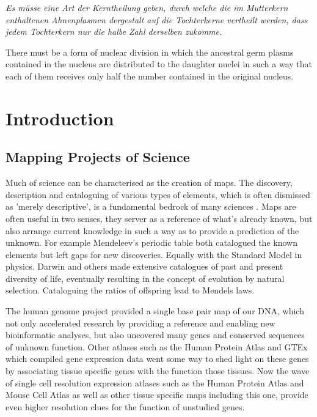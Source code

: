 \begin{savequote}[8cm]
\textit{Es müsse eine Art der Kerntheilung geben, durch welche die im Mutterkern enthaltenen Ahnenplasmen dergestalt auf die Tochterkerne vertheilt werden, dass jedem Tochterkern nur die halbe Zahl derselben zukomme.}

There must be a form of nuclear division in which the ancestral germ plasms contained in the nucleus are distributed to the daughter nuclei in such a way that each of them receives only half the number contained in the original nucleus.
\end{savequote}

\chapter{\label{ch:1-intro}Introduction} 

\minitoc


\section{Mapping Projects of Science}

Much of science can be characterised as the creation of maps. The discovery, description and cataloguing of various types of elements, which is often dismissed as 'merely descriptive', is a fundamental bedrock of many sciences \cite{Grimaldi2007}. Maps are often useful in two senses, they server as a reference of what's already known, but also arrange current knowledge in such a way as to provide a prediction of the unknown. For example Mendeleev's periodic table both catalogued the known elements but left gaps for new discoveries. Equally with the Standard Model in physics. Darwin and others made extensive catalogues of past and present diversity of life, eventually resulting in the concept of evolution by natural selection. Cataloguing the ratios of offspring lead to Mendels laws.

The human genome project provided a single base pair map of our DNA, which not only accelerated research by providing a reference and enabling new bioinformatic analyses, but also uncovered many genes and conserved sequences of unknown function. Other atlases such as the Human Protein Atlas and GTEx which compiled gene expression data went some way to shed light on these genes by associating tissue specific genes with the function those tissues. Now the wave of single cell resolution expression atlases such as the Human Protein Atlas and Mouse Cell Atlas as well as other tissue specific maps including this one, provide even higher resolution clues for the function of unstudied genes.

